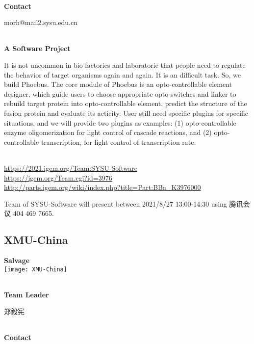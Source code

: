 \textbf{\\Contact}

  morh@mail2.sysu.edu.cn


\textbf{\\A Software Project\\}\begin{spacing}{1.5}

It is not uncommon in bio-factories and laboratorie that people need to regulate the behavior of target organisms again and again. It is an difficult task. So, we build Phoebus. The core module of Phoebus is an opto-controllable element designer, which guide users to choose appropriate opto-switches and linker to rebuild target protein into opto-controllable element, predict the structure of the fusion protein and evaluate its acticity. User still need specific plugins for specific situations, and we will provide two plugins as examples: (1) opto-controllable enzyme oligomerization for light control of cascade reactions, and (2) opto-controllable transcription, for light control of transcription rate.\end{spacing}
\\

\url{https://2021.igem.org/Team:SYSU-Software }\\
\url{https://igem.org/Team.cgi?id=3976 }\\
\url{http://parts.igem.org/wiki/index.php?title=Part:BBa_K3976000 }\\


\vfill{}









Team of SYSU-Software will present between 2021/8/27 13:00-14:30        using 腾讯会议 404 469 7665.
\newpage


\subsection{\textcolor{Blu}{ XMU-China } }
\vspace{5mm}
\begin{center}
\large{
  \textbf{ Salvage }\\
  \texttt{[image: XMU-China]}
}
\end{center}
\textbf{\\Team Leader}

  郑毅宪


\textbf{\\Contact}

